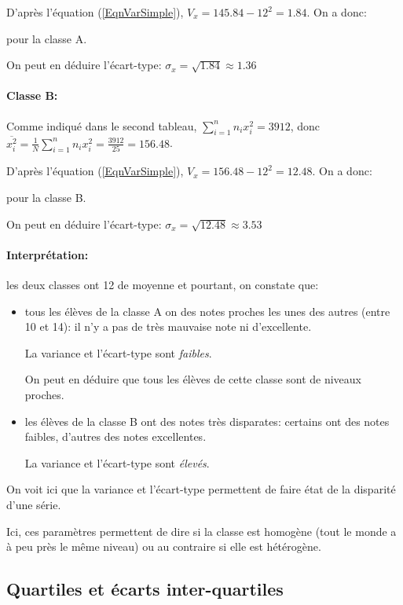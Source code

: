 \documentclass[a4paper,12pt]{scrartcl}
\begin{document}
D'après l'équation (\ref{EqnVarSimple}), $V_x = 145.84 - 12^2 = 1.84$. On a donc:


pour la classe A.

On peut en déduire l'écart-type: $\sigma_x = \sqrt{1.84} \approx 1.36$

\paragraph{Classe B:}
Comme indiqué dans le second tableau, $\sum_{i=1}^{n}n_i x_i^2 = 3912$, donc $\overline{x_i^2} = \frac{1}{N} \sum_{i=1}^{n}n_i x_i^2 = \frac{3912}{25} = 156.48$.

D'après l'équation (\ref{EqnVarSimple}), $V_x = 156.48 - 12^2 = 12.48$. On a donc:


pour la classe B.

On peut en déduire l'écart-type: $\sigma_x = \sqrt{12.48} \approx 3.53$

\paragraph{Interprétation:} les deux classes ont 12 de moyenne et pourtant, on constate que:

\begin{itemize}
\item tous les élèves de la classe A on des notes proches les unes des autres (entre 10 et 14): il n'y a pas de très mauvaise note ni d'excellente. 

La variance et l'écart-type sont \emph{faibles}. 

On peut en déduire que tous les élèves de cette classe sont de niveaux proches.

\item les élèves de la classe B ont des notes très disparates: certains ont des notes faibles, d'autres des notes excellentes. 

La variance et l'écart-type sont \emph{élevés}. 
\end{itemize}

On voit ici que la variance et l'écart-type permettent de faire état de la disparité d'une série. 

Ici, ces paramètres permettent de dire si la classe est homogène (tout le monde a à peu près le même niveau) ou au contraire si elle est hétérogène.

\subsection{Quartiles et écarts inter-quartiles}
\end{document}
